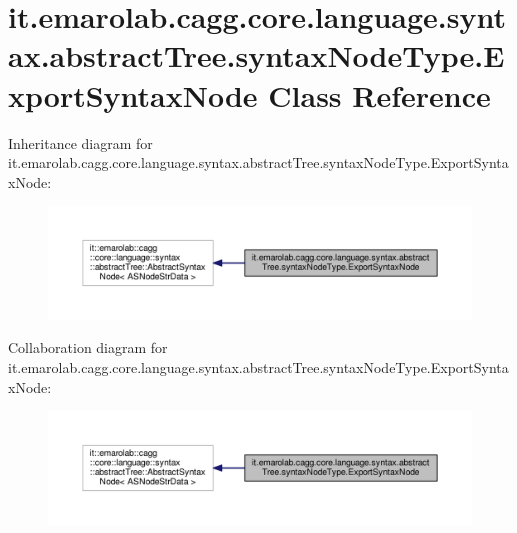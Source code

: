 \hypertarget{classit_1_1emarolab_1_1cagg_1_1core_1_1language_1_1syntax_1_1abstractTree_1_1syntaxNodeType_1_1ExportSyntaxNode}{\section{it.\-emarolab.\-cagg.\-core.\-language.\-syntax.\-abstract\-Tree.\-syntax\-Node\-Type.\-Export\-Syntax\-Node Class Reference}
\label{classit_1_1emarolab_1_1cagg_1_1core_1_1language_1_1syntax_1_1abstractTree_1_1syntaxNodeType_1_1ExportSyntaxNode}
}


Inheritance diagram for it.\-emarolab.\-cagg.\-core.\-language.\-syntax.\-abstract\-Tree.\-syntax\-Node\-Type.\-Export\-Syntax\-Node\-:\nopagebreak
\begin{figure}[H]
\begin{center}
\leavevmode
\includegraphics[width=350pt]{classit_1_1emarolab_1_1cagg_1_1core_1_1language_1_1syntax_1_1abstractTree_1_1syntaxNodeType_1_1ExportSyntaxNode__inherit__graph}
\end{center}
\end{figure}


Collaboration diagram for it.\-emarolab.\-cagg.\-core.\-language.\-syntax.\-abstract\-Tree.\-syntax\-Node\-Type.\-Export\-Syntax\-Node\-:\nopagebreak
\begin{figure}[H]
\begin{center}
\leavevmode
\includegraphics[width=350pt]{classit_1_1emarolab_1_1cagg_1_1core_1_1language_1_1syntax_1_1abstractTree_1_1syntaxNodeType_1_1ExportSyntaxNode__coll__graph}
\end{center}
\end{figure}
